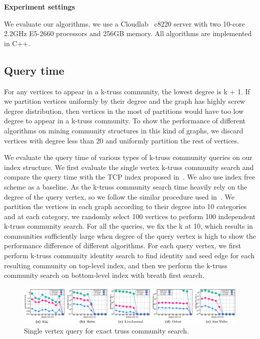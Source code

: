\vskip 0.1in \noindent \textbf{Experiment settings} 

We evaluate our algorithms, we use a Cloudlab~\cite{RicciEide:login14} c8220 server with two 10-core 2.2GHz E5-2660 processors and 256GB memory. All algorithms are implemented in C++. 

\subsection{Query time}
\label{eval_query_time}

For any vertices to appear in a k-truss community, the lowest degree is k + 1. If we partition vertices uniformly by their degree and the graph has highly screw degree distribution, then vertices in the most of partitions would have too low degree to appear in a k-truss community. To show the performance of different algorithms on mining community structures in this kind of graphs, we discard vertices with degree less than 20 and uniformly partition the rest of vertices.


We evaluate the query time of various types of k-truss community queries on our index structure. We first evaluate the single vertex k-truss community search and compare the query time with the TCP index proposed in~\cite{huang2014querying}. We also use index free scheme as a baseline. As the k-truss community search time heavily rely on the degree of the query vertex, so we follow the similar procedure used in~\cite{huang2014querying}. We partition the vertices in each graph according to their degree into 10 categories and at each category, we randomly select 100 vertices to perform 100 independent k-truss community search. For all the queries, we fix the k at 10, which results in communities sufficiently large when degree of the query vertex is high to show the performance difference of different algorithms. For each query vertex, we first perform k-truss community identity search to find identity and seed edge for each resulting community on top-level index, and then we perform the k-truss community search on bottom-level index with breath first search.

\begin{figure}[ht]
    \centering
		\includegraphics[width=\linewidth]{./figures/example1.png}
    \caption{Single vertex query for exact truss community search.}
    \label{fig:single_v_query_degree}
\end{figure}

